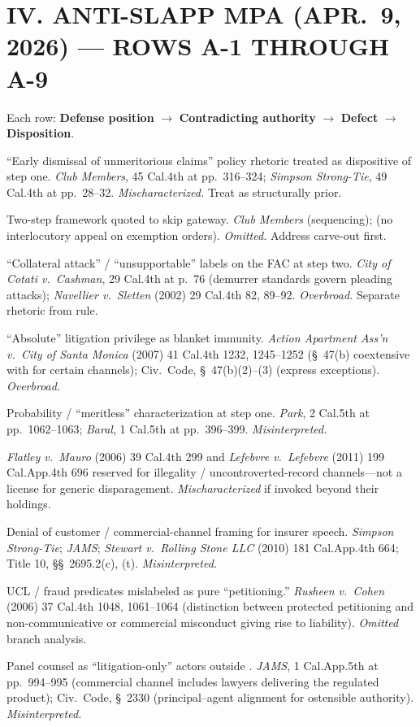 \section*{IV. ANTI-SLAPP MPA (APR.\ 9, 2026) --- ROWS A-1 THROUGH A-9}

Each row: \textbf{Defense position} $\rightarrow$ \textbf{Contradicting authority} $\rightarrow$ \textbf{Defect} $\rightarrow$ \textbf{Disposition}.

\begin{description}
\tightlist
\item[A-1.] ``Early dismissal of unmeritorious claims'' policy rhetoric treated as dispositive of step one. \textit{Club Members}, 45 Cal.4th at pp.\ 316--324; \textit{Simpson Strong-Tie}, 49 Cal.4th at pp.\ 28--32. \textit{Mischaracterized.} Treat  as structurally prior.
\item[A-2.] Two-step  framework quoted to skip  gateway. \textit{Club Members} (sequencing);  (no interlocutory appeal on exemption orders). \textit{Omitted.} Address carve-out first.
\item[A-3.] ``Collateral attack'' / ``unsupportable'' labels on the FAC at step two. \textit{City of Cotati v.\ Cashman}, 29 Cal.4th at p.\ 76 (demurrer standards govern pleading attacks); \textit{Navellier v.\ Sletten} (2002) 29 Cal.4th 82, 89--92. \textit{Overbroad.} Separate rhetoric from rule.
\item[A-4.] ``Absolute'' litigation privilege as blanket immunity. \textit{Action Apartment Ass'n v.\ City of Santa Monica} (2007) 41 Cal.4th 1232, 1245--1252 (\S~47(b) coextensive with  for certain channels); Civ.\ Code, \S~47(b)(2)--(3) (express exceptions). \textit{Overbroad.}
\item[A-5.] Probability / ``meritless'' characterization at step one. \textit{Park}, 2 Cal.5th at pp.\ 1062--1063; \textit{Baral}, 1 Cal.5th at pp.\ 396--399. \textit{Misinterpreted.}
\item[A-6.] \textit{Flatley v.\ Mauro} (2006) 39 Cal.4th 299 and \textit{Lefebvre v.\ Lefebvre} (2011) 199 Cal.App.4th 696 reserved for illegality / uncontroverted-record channels---not a license for generic disparagement. \textit{Mischaracterized} if invoked beyond their holdings.
\item[A-7.] Denial of customer / commercial-channel framing for insurer speech. \textit{Simpson Strong-Tie}; \textit{JAMS}; \textit{Stewart v.\ Rolling Stone LLC} (2010) 181 Cal.App.4th 664; Title 10, \S\S~2695.2(c), (t). \textit{Misinterpreted.}
\item[A-8.] UCL / fraud predicates mislabeled as pure ``petitioning.'' \textit{Rusheen v.\ Cohen} (2006) 37 Cal.4th 1048, 1061--1064 (distinction between protected petitioning and non-communicative or commercial misconduct giving rise to liability). \textit{Omitted} branch analysis.
\item[A-9.] Panel counsel as ``litigation-only'' actors outside . \textit{JAMS}, 1 Cal.App.5th at pp.\ 994--995 (commercial channel includes lawyers delivering the regulated product); Civ.\ Code, \S~2330 (principal--agent alignment for ostensible authority). \textit{Misinterpreted.}
\end{description}

